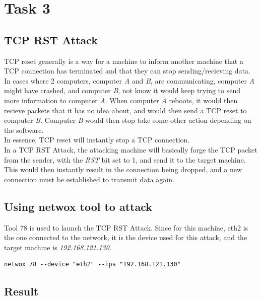 \documentclass[12pt]{article}
\begin{document}
\section{Task 3}
\subsection{TCP RST Attack}
TCP reset generally is a way for a machine to inform another machine that a TCP connection has terminated and that they can stop sending/recieving data. In cases where 2 computers, computer \emph{A} and \emph{B}, are communicating, computer \emph{A} might have crashed, and computer \emph{B}, not know it would keep trying to send more information to computer \emph{A}. When computer \emph{A} reboots, it would then recieve packets that it has no idea about, and would then send a TCP reset to computer \emph{B}. Computer \emph{B} would then stop take some other action depending on the software. \\

In essence, TCP reset will instantly stop a TCP connection. \\

In a TCP RST Attack, the attacking machine will basically forge the TCP packet from the sender, with the \emph{RST} bit set to 1, and send it to the target machine. This would then instantly result in the connection being dropped, and a new connection must be established to transmit data again. \\

\subsection{Using netwox tool to attack}
Tool 78 is used to launch the TCP RST Attack. Since for this machine, eth2 is the one connected to the network, it is the device used for this attack, and the target machine is \emph{192.168.121.130}. \\

\begin{lstlisting}
netwox 78 --device "eth2" --ips "192.168.121.130"
\end{lstlisting}

\subsection{Result}
\end{document}
